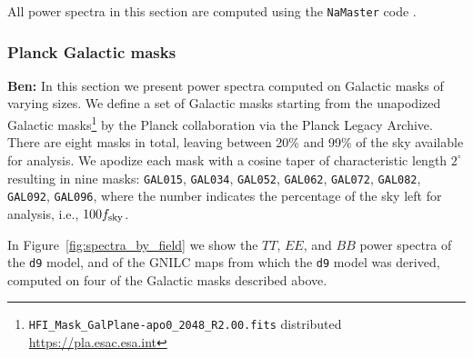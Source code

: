\documentclass[twocolumn]{aastex631}
\newcommand{\dnine}{{\tt d9}}
\begin{document}
All power spectra in this section are computed using the {\tt NaMaster} code \citep{Alonso:2019}. 

\subsubsection{Planck Galactic masks} \label{sec:galactic_spectra}

\textbf{Ben:} In this section we present power spectra computed on Galactic masks of varying sizes. We define a set of Galactic masks starting from the unapodized Galactic masks\footnote{\texttt{HFI\_Mask\_GalPlane-apo0\_2048\_R2.00.fits} distributed \url{https://pla.esac.esa.int}} by the Planck collaboration via the Planck Legacy Archive. There are eight masks in total, leaving between 20\% and 99\% of the sky available for analysis. We apodize each mask with a cosine taper of characteristic length $2^\circ$ resulting in nine masks: \texttt{GAL015}, \texttt{GAL034}, \texttt{GAL052}, \texttt{GAL062}, \texttt{GAL072}, \texttt{GAL082}, \texttt{GAL092}, \texttt{GAL096}, where the number indicates the percentage of the sky left for analysis, i.e., $100 f_{\rm sky}$.  

In Figure~\ref{fig:spectra_by_field} we show the $TT$, $EE$, and $BB$ power spectra of the \dnine{} model, and of the GNILC maps from which the \dnine{} model was derived, computed on four of the Galactic masks described above.
\end{document}
